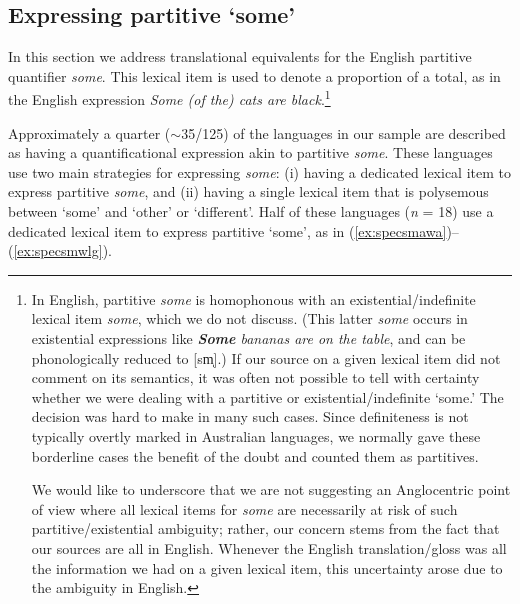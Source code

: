\documentclass[12pt,egregdoesnotlikesansseriftitles]{scrartcl}
\begin{document}
\subsection{Expressing partitive `some'}
\label{sec:some}
In this section we address translational equivalents for the English partitive quantifier \textit{some}. This lexical item is used to denote a proportion of a total, as in the English expression \textit{Some (of the) cats are black}.\footnote{In English, partitive \textit{some} is homophonous with an existential/indefinite lexical item \textit{some}, which we do not discuss. (This latter \textit{some} occurs in existential expressions like \textit{\textbf{Some} bananas are on the table}, and can be phonologically reduced to [{\charis sm̩]}.) If our source on a given lexical item did not comment on its semantics, it was often not possible to tell with certainty whether we were dealing with a partitive or existential/indefinite `some.' The decision was hard to make in many such cases. Since definiteness is not typically overtly marked in Australian languages, we normally gave these borderline cases the benefit of the doubt and counted them as partitives. %

We would  like to underscore that we are not suggesting an Anglocentric point of view where all lexical items for \textit{some} are necessarily at risk of such partitive/existential ambiguity; rather, our concern stems from the fact that our sources are all in English. Whenever the English translation/gloss was all the information we had on a given lexical item, this uncertainty arose due to the ambiguity in English.} %

Approximately a quarter ($\sim$35/125) of the languages in our sample are described as having a quantificational expression akin to partitive \textit{some}. These languages use two main strategies for expressing \textit{some}: (i) having a dedicated lexical item to express partitive \textit{some}, and (ii) having a single lexical item that is polysemous between `some' and `other' or `different'. Half of these languages (\textit{n} = 18) use a dedicated lexical item to express partitive `some', as in (\ref{ex:specsmawa})--(\ref{ex:specsmwlg}).
\end{document}
